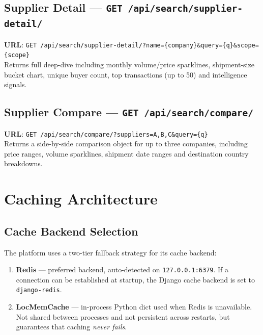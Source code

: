 \documentclass[12pt,a4paper]{article}
\begin{document}
\subsection{Supplier Detail --- \texttt{GET /api/search/supplier-detail/}}

\begin{infobox}
\textbf{URL}: \texttt{GET /api/search/supplier-detail/?name=\{company\}\&query=\{q\}\&scope=\{scope\}}\\
Returns full deep-dive including monthly volume/price sparklines, shipment-size
bucket chart, unique buyer count, top transactions (up to 50) and intelligence signals.
\end{infobox}

\subsection{Supplier Compare --- \texttt{GET /api/search/compare/}}

\begin{infobox}
\textbf{URL}: \texttt{GET /api/search/compare/?suppliers=A,B,C\&query=\{q\}}\\
Returns a side-by-side comparison object for up to three companies, including price
ranges, volume sparklines, shipment date ranges and destination country breakdowns.
\end{infobox}

\newpage
\section{Caching Architecture}
\label{sec:caching}

\subsection{Cache Backend Selection}

The platform uses a two-tier fallback strategy for its cache backend:

\begin{enumerate}
  \item \textbf{Redis} --- preferred backend, auto-detected on
        \texttt{127.0.0.1:6379}.  If a connection can be established at startup,
        the Django cache backend is set to \texttt{django-redis}.
  \item \textbf{LocMemCache} --- in-process Python dict used when Redis is
        unavailable.  Not shared between processes and not persistent across restarts,
        but guarantees that caching \emph{never fails}.
\end{enumerate}
\end{document}
